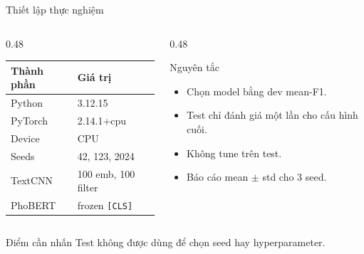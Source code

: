 \documentclass[aspectratio=169,11pt]{beamer}
\begin{document}
\begin{frame}{Thiết lập thực nghiệm}
\begin{columns}[T]
\begin{column}{0.48\textwidth}
\begin{tabular}{@{}ll@{}}
\toprule
Thành phần & Giá trị \\
\midrule
Python & 3.12.15 \\
PyTorch & 2.14.1+cpu \\
Device & CPU \\
Seeds & 42, 123, 2024 \\
TextCNN & 100 emb, 100 filter \\
PhoBERT & frozen \texttt{[CLS]} \\
\bottomrule
\end{tabular}
\end{column}
\begin{column}{0.48\textwidth}
\begin{block}{Nguyên tắc}
\begin{itemize}
  \item Chọn model bằng dev mean-F1.
  \item Test chỉ đánh giá một lần cho cấu hình cuối.
  \item Không tune trên test.
  \item Báo cáo mean $\pm$ std cho 3 seed.
\end{itemize}
\end{block}
\end{column}
\end{columns}

\vspace{0.25cm}
\begin{alertblock}{Điểm cần nhấn}
Test không được dùng để chọn seed hay hyperparameter.
\end{alertblock}
\end{frame}
\end{document}
